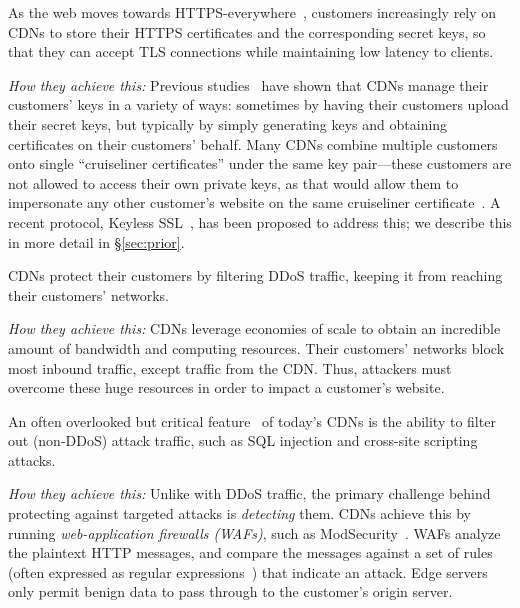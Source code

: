 
%
As the web moves towards
HTTPS-everywhere~\cite{felt-2017-https}, customers increasingly
rely on CDNs to store their HTTPS certificates and the corresponding
secret keys, so that they can accept TLS connections while maintaining
low latency to clients.


\medskip\noindent
%
\emph{How they achieve this:}
%
Previous studies~\cite{key-sharing,when-https-meets-cdn} have shown
that CDNs manage their customers' keys in a variety of ways: sometimes
by having their customers upload their secret keys, but typically by
simply generating keys and obtaining certificates on their customers'
behalf.
%
Many CDNs combine multiple customers onto single ``cruiseliner
certificates'' under the same key pair---these customers are not allowed
to access their own private keys, as that would allow them to
impersonate any other customer's website on the same cruiseliner
certificate~\cite{key-sharing}.
%
A recent protocol, Keyless SSL~\cite{keyless-ssl}, has been proposed
to address this; we describe this in more detail in \S\ref{sec:prior}.


%
CDNs protect their customers by filtering DDoS traffic, keeping it from
reaching their customers' networks.

\medskip\noindent
%
\emph{How they achieve this:}
%
CDNs leverage economies of scale to obtain an incredible amount of
bandwidth and computing resources.  Their customers' networks block
most inbound traffic, except traffic from the CDN.
%
Thus, attackers must overcome these huge resources in order to impact a
customer's website.


%
An often overlooked but critical feature~\cite{securing-cdns} of
today's CDNs is the ability to filter out (non-DDoS) attack traffic,
such as SQL injection and cross-site scripting attacks.


\medskip\noindent
%
\emph{How they achieve this:}
%
Unlike with DDoS traffic, the primary challenge behind protecting
against targeted attacks is \emph{detecting} them.
%
CDNs achieve this by running \emph{web-application firewalls (WAFs)},
such as ModSecurity~\cite{modsecurity}.
%
WAFs analyze the plaintext HTTP messages, and compare the messages against
a set of rules (often expressed as regular expressions~\cite{owasp})
that indicate an attack.
%
Edge servers only permit benign data to pass through to the customer's
origin server.



